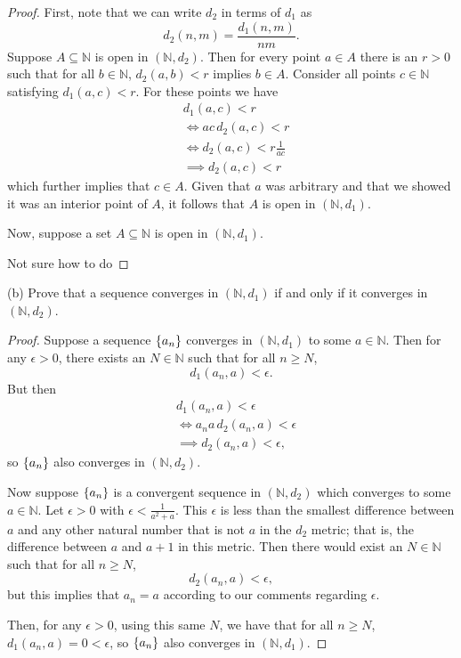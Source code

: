 \documentclass{article}
\newcommand{\N}{\mathbb{N}}
\begin{document}
\begin{proof}

First, note that we can write $d_2$ in terms of $d_1$ as
%
\begin{equation*}
    d_2(n, m) = \frac{d_1(n, m)}{n m}
    .
\end{equation*}
%
Suppose $A \subseteq \N$ is open in $(\N, d_2)$. Then for every
point $a \in A$ there is an $r > 0$ such that for all $b \in \N$,
$d_2(a, b) < r$ implies $b \in A$.
%
Consider all points $c \in \N$ satisfying $d_1(a, c) < r$. For these
points we have
%
\begin{align*}
    &d_1(a, c) < r \\
    &\iff a c \, d_2(a, c) < r \\
    &\iff d_2(a, c) < r \frac{1}{a c} \\
    &\implies d_2(a, c) < r
\end{align*}
%
which further implies that $c \in A$. Given that $a$ was arbitrary and
that we showed it was an interior point of $A$, it follows that $A$ is
open in $(\N, d_1)$.

Now, suppose a set $A \subseteq \N$ is open in $(\N, d_1)$.

Not sure how to do

\end{proof}

\newpage

(b) Prove that a sequence converges in $(\N, d_1)$ if and only if it
converges in $(\N, d_2)$.

\begin{proof}

Suppose a sequence $\cbr{a_n}$ converges in $(\N, d_1)$ to some $a \in
\N$. Then for any $\epsilon > 0$, there exists an $N \in \N$ such that
for all $n \geq N$,
%
\begin{equation*}
    d_1(a_n, a) < \epsilon
    .
\end{equation*}
%
But then
%
\begin{align*}
    &d_1(a_n, a) < \epsilon \\
    &\iff a_n a \, d_2(a_n, a) < \epsilon \\
    &\implies d_2(a_n, a) < \epsilon
    ,
\end{align*}
%
so $\cbr{a_n}$ also converges in $(\N, d_2)$.

Now suppose $\cbr{a_n}$ is a convergent sequence in $(\N, d_2)$ which
converges to some $a \in \N$. Let $\epsilon > 0$ with $\epsilon <
\frac{1}{a^2 + a}$. This $\epsilon$ is less than the smallest difference
between $a$ and any other natural number that is not $a$ in the $d_2$
metric; that is, the difference between $a$ and $a + 1$ in this metric.
Then there would exist an $N \in \N$ such that for all $n \geq N$,
%
\begin{equation*}
    d_2(a_n, a) < \epsilon
    ,
\end{equation*}
%
but this implies that $a_n = a$ according to our comments regarding
$\epsilon$.

Then, for any $\epsilon > 0$, using this same $N$, we have that for all
$n \geq N$, $d_1(a_n, a) = 0 < \epsilon$, so $\cbr{a_n}$ also converges
in $(\N, d_1)$.

\end{proof}
\end{document}
